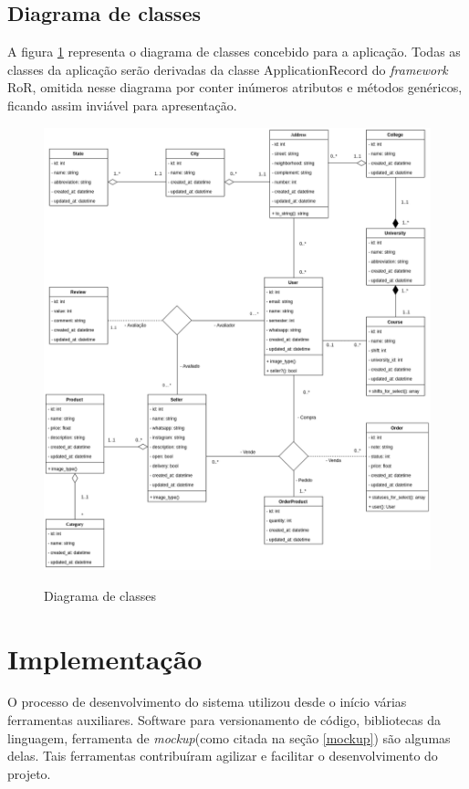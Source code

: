 \subsection{Diagrama de classes}
A figura \ref{fig:class} representa o diagrama de classes concebido para a aplicação. Todas as classes da aplicação serão derivadas da classe ApplicationRecord do \textit{framework} RoR, omitida nesse diagrama por conter inúmeros atributos e métodos genéricos, ficando assim inviável para apresentação.
\begin{figure}[htbp!]
  \centering
  \caption{Diagrama de classes}
  \includegraphics[width=1\textwidth]{figs/class.png}
    \label{fig:class}
\end{figure}

\section{Implementação}
O processo de desenvolvimento do sistema utilizou desde o início várias ferramentas auxiliares. Software para versionamento de código, bibliotecas da linguagem, ferramenta de \textit{mockup}(como citada na seção \ref{mockup}) são algumas delas. Tais ferramentas contribuíram agilizar e facilitar o desenvolvimento do projeto.
